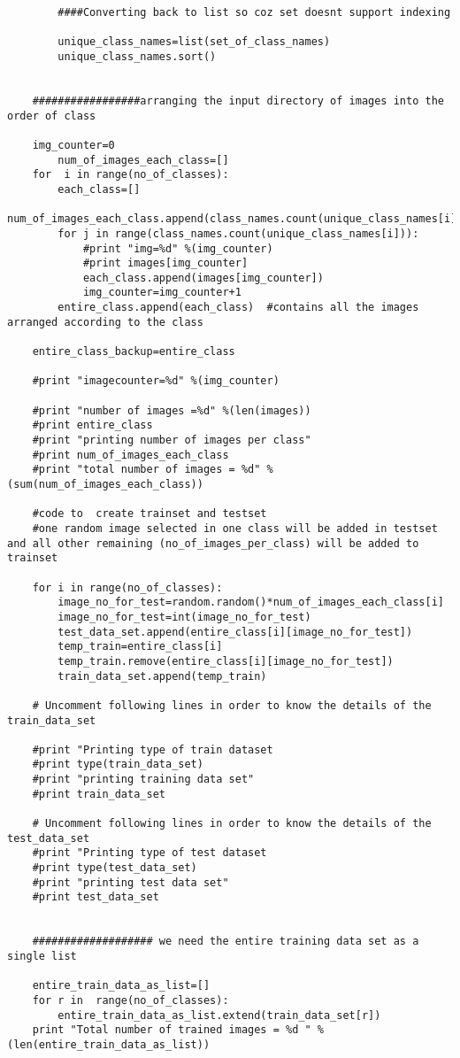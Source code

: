 \documentclass[10pt,a4paper]{article}
\begin{document}
\begin{lstlisting}
		####Converting back to list so coz set doesnt support indexing

		unique_class_names=list(set_of_class_names)
		unique_class_names.sort()

	
	#################arranging the input directory of images into the order of class

	img_counter=0
        num_of_images_each_class=[]
	for  i in range(no_of_classes):
		each_class=[]
		num_of_images_each_class.append(class_names.count(unique_class_names[i]))
		for j in range(class_names.count(unique_class_names[i])):
			#print "img=%d" %(img_counter)
			#print images[img_counter]
			each_class.append(images[img_counter])
			img_counter=img_counter+1
		entire_class.append(each_class)  #contains all the images arranged according to the class
	
	entire_class_backup=entire_class

	#print "imagecounter=%d" %(img_counter)
	
	#print "number of images =%d" %(len(images))
	#print entire_class
	#print "printing number of images per class"
	#print num_of_images_each_class
	#print "total number of images = %d" %(sum(num_of_images_each_class))

	#code to  create trainset and testset 
	#one random image selected in one class will be added in testset and all other remaining (no_of_images_per_class) will be added to trainset

	for i in range(no_of_classes):
		image_no_for_test=random.random()*num_of_images_each_class[i]	
		image_no_for_test=int(image_no_for_test)
		test_data_set.append(entire_class[i][image_no_for_test])
		temp_train=entire_class[i]
		temp_train.remove(entire_class[i][image_no_for_test])
		train_data_set.append(temp_train)

	# Uncomment following lines in order to know the details of the train_data_set
	
	#print "Printing type of train dataset 	
	#print type(train_data_set)
	#print "printing training data set"
	#print train_data_set

	# Uncomment following lines in order to know the details of the test_data_set
	#print "Printing type of test dataset 	
	#print type(test_data_set)
	#print "printing test data set"
	#print test_data_set
	
			
	################### we need the entire training data set as a single list

	entire_train_data_as_list=[]
	for r in  range(no_of_classes):
		entire_train_data_as_list.extend(train_data_set[r])
	print "Total number of trained images = %d " %(len(entire_train_data_as_list))
	

\end{lstlisting}
\end{document}
